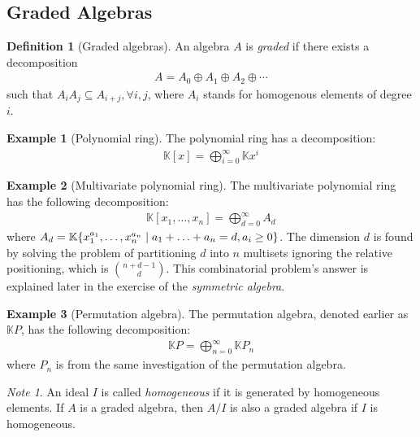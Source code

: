 \documentclass{article}
\theoremstyle{definition}
\newtheorem{Definition}{Definition}
\newtheorem*{Example*}{Example}
\theoremstyle{remark}
\newtheorem*{Note*}{Note}
\theoremstyle{underline}
\theoremstyle{underline}
\begin{document}
	\subsection{Graded Algebras}

	\begin{Definition}[Graded algebras]
		An algebra $A$ is \emph{graded} if there exists a decomposition
		\begin{gather*}
			A = A_0 \oplus A_1 \oplus A_2 \oplus \cdots
		\end{gather*}
		such that $A_i A_j \subseteq A_{i+j}, \forall i,j$, where $A_i$ stands for homogenous elements of degree $i$.
	\end{Definition}

	\begin{Example*}[Polynomial ring]
		The polynomial ring has a decomposition:
		\begin{gather*}
			\mathbb K[x] = \bigoplus_{i=0}^{\infty} \mathbb K x^i
		\end{gather*}
	\end{Example*}

	\begin{Example*}[Multivariate polynomial ring]
		The multivariate polynomial ring has the following decomposition:
		\begin{gather*}
			\mathbb K[x_1,\ldots,x_n] = \bigoplus_{d=0}^{\infty} A_d
		\end{gather*}
		where $A_d = \mathbb K\qty{x_1^{a_1},\ldots, x_n^{a_n}\mid a_1 + \ldots + a_n = d, a_i \geq 0}$. The dimension $d$ is found by solving the problem of partitioning $d$ into $n$ multisets ignoring the relative positioning, which is $\binom{n+d-1}{d}$. This combinatorial problem's answer is explained later in the exercise of the \emph{symmetric algebra}.
	\end{Example*}

	\begin{Example*}[Permutation algebra]
		The permutation algebra, denoted earlier as $\mathbb KP$, has the following decomposition:
		\begin{gather*}
			\mathbb KP = \bigoplus_{n=0}^{\infty} \mathbb KP_n
		\end{gather*}
		where $P_n$ is from the same investigation of the permutation algebra.
	\end{Example*}

	\begin{Note*}
		An ideal $I$ is called \emph{homogeneous} if it is generated by homogeneous elements. If $A$ is a graded algebra, then $A/I$ is also a graded algebra if $I$ is homogeneous.
	\end{Note*}
\end{document}
